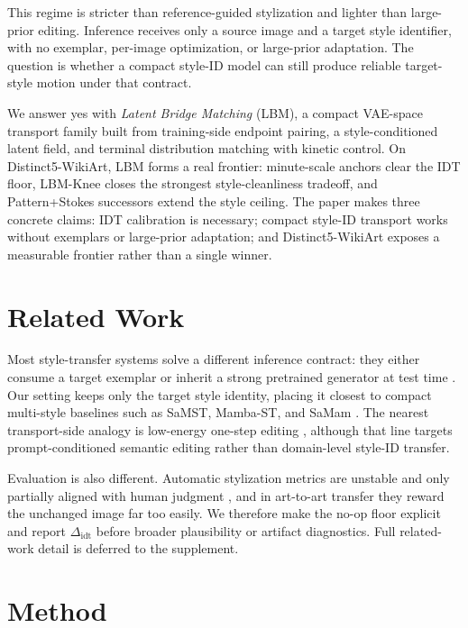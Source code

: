 \documentclass[letterpaper]{article}
\begin{document}
This regime is stricter than reference-guided stylization and lighter than large-prior editing. Inference receives only a source image and a target style identifier, with no exemplar, per-image optimization, or large-prior adaptation. The question is whether a compact style-ID model can still produce reliable target-style motion under that contract.

We answer yes with \emph{Latent Bridge Matching} (LBM), a compact VAE-space transport family built from training-side endpoint pairing, a style-conditioned latent field, and terminal distribution matching with kinetic control. On Distinct5-WikiArt, LBM forms a real frontier: minute-scale anchors clear the IDT floor, LBM-Knee closes the strongest style-cleanliness tradeoff, and Pattern+Stokes successors extend the style ceiling. The paper makes three concrete claims: IDT calibration is necessary; compact style-ID transport works without exemplars or large-prior adaptation; and Distinct5-WikiArt exposes a measurable frontier rather than a single winner.

\section{Related Work}
Most style-transfer systems solve a different inference contract: they either consume a target exemplar or inherit a strong pretrained generator at test time \cite{gatys2016image,huang2017adain,deng2022stytr2,hong2023aespa,huang2024aesfa,zhang2024artbank,chung2024styleid}. Our setting keeps only the target style identity, placing it closest to compact multi-style baselines such as SaMST, Mamba-ST, and SaMam \cite{liu2024samst,botti2025mambast,liu2025samam}. The nearest transport-side analogy is low-energy one-step editing \cite{lu2026chordedit}, although that line targets prompt-conditioned semantic editing rather than domain-level style-ID transfer.

Evaluation is also different. Automatic stylization metrics are unstable and only partially aligned with human judgment \cite{zhou2024comprehensiveeval,yeh2020calibrated,wright2022artfid}, and in art-to-art transfer they reward the unchanged image far too easily. We therefore make the no-op floor explicit and report $\Delta_{\mathrm{idt}}$ before broader plausibility or artifact diagnostics. Full related-work detail is deferred to the supplement.

\section{Method}
\end{document}
